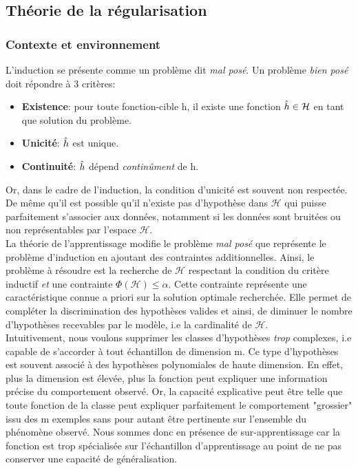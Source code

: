\subsection{Théorie de la régularisation}
\subsubsection{Contexte et environnement}
\noindent L'induction se présente comme un problème dit \textit{mal posé}. Un problème \textit{bien posé} doit répondre à 3 critères:
\begin{itemize}
    \item \textbf{Existence}: pour toute fonction-cible h, il existe une fonction $\Hat{h} \in \mathcal{H}$ en tant que solution du problème.\\

    \item \textbf{Unicité}: $\Hat{h}$ est unique.\\

    \item \textbf{Continuité}: $\Hat{h}$ dépend \textit{continûment} de h.
\end{itemize}

\noindent Or, dans le cadre de l'induction, la condition d'unicité est souvent non respectée. De même qu'il est possible qu'il n'existe pas d'hypothèse dans $\mathcal{H}$ qui puisse parfaitement s'associer aux données, notamment si les données sont bruitées ou non représentables par l'espace $\mathcal{H}$. \\

\noindent La théorie de l'apprentissage modifie le problème \textit{mal posé} que représente le problème d'induction en ajoutant des contraintes additionnelles. Ainsi, le problème à résoudre est la recherche de $\mathcal{H}$ respectant la condition du critère inductif \textit{et} une contrainte $\Phi(\mathcal{H}) \leq \alpha$. Cette contrainte représente une caractéristique connue a priori sur la solution optimale recherchée. Elle permet de compléter la discrimination des hypothèses valides et ainsi, de diminuer le nombre d'hypothèses recevables par le modèle, i.e la cardinalité de $\mathcal{H}$.\\

\noindent Intuitivement, nous voulons supprimer les classes d'hypothèses \textit{trop} complexes, i.e capable de s'accorder à tout échantillon de dimension m. Ce type d'hypothèses est souvent associé à des hypothèses polynomiales de haute dimension. En effet, plus la dimension est élevée, plus la fonction peut expliquer une information précise du comportement observé. Or, la capacité explicative peut être telle que toute fonction de la classe peut expliquer parfaitement le comportement "grossier" issu des m exemples sans pour autant être pertinente sur l'ensemble du phénomène observé. Nous sommes donc en présence de sur-apprentissage car la fonction est trop spécialisée sur l'échantillon d'apprentissage au point de ne pas conserver une capacité de généralisation.\\

